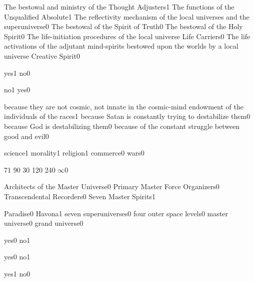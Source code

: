 {The bestowal and ministry of the Thought Adjusters}{1}
{The functions of the Unqualified Absolute}{1}
{The reflectivity mechanism of the local universes and the superuniverse}{0}
{The bestowal of the Spirit of Truth}{0}
{The bestowal of the Holy Spirit}{0}
{The life-initiation procedures of the local universe Life Carriers}{0}
{The life activations of the adjutant mind-spirits bestowed upon the worlds by a local universe Creative Spirit}{0}
\qstop

{yes}{1}
{no}{0}
\qstop

{no}{1}
{yes}{0}
\qstop

{because they are not cosmic, not innate in the cosmic-mind endowment of the individuals of the races}{1}
{because Satan is constantly trying to destabilize them}{0}
{because God is destabilizing them}{0}
{because of the constant struggle between good and evil}{0}
\qstop

{science}{1}
{morality}{1}
{religion}{1}
{commerce}{0}
{wars}{0}
\qstop

{7}{1}
{9}{0}
{3}{0}
{12}{0}
{24}{0}
{$\infty$}{0}
\qstop

{Architects of the Master Universe}{0}
{Primary Master Force Organizers}{0}
{Transcendental Recorders}{0}
{Seven Master Spirits}{1}
\qstop


{Paradise}{0}
{Havona}{1}
{seven superuniverses}{0}
{four outer space levels}{0}
{master universe}{0}
{grand universe}{0}
\qstop

{yes}{0}
{no}{1}
\qstop

{yes}{0}
{no}{1}
\qstop

{yes}{1}
{no}{0}
\qstop

